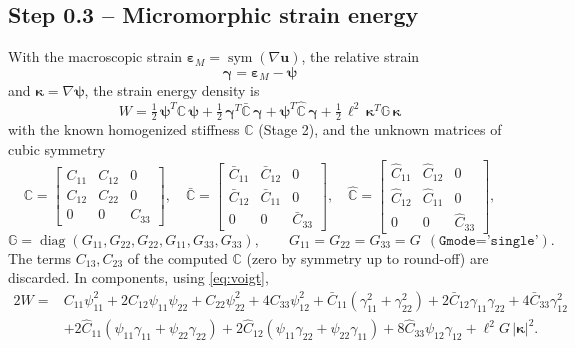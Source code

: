 \documentclass[11pt,a4paper]{article}
\newcommand{\C}{\mathbb{C}}                     %
\newcommand{\Cb}{\bar{\mathbb{C}}}              %
\newcommand{\Ch}{\hat{\mathbb{C}}}              %
\newcommand{\GG}{\mathbb{G}}                    %
\newcommand{\epsM}{\bm{\varepsilon}_{M}}
\newcommand{\bpsi}{\bm{\psi}}
\newcommand{\bgam}{\bm{\gamma}}
\newcommand{\bkap}{\bm{\kappa}}
\newcommand{\bu}{\bm{u}}
\newcommand{\sym}{\operatorname{sym}}
\newcommand{\code}[1]{\texttt{#1}}
\theoremstyle{plain}
\theoremstyle{remark}
\begin{document}
\subsection*{Step 0.3 -- Micromorphic strain energy}
With the macroscopic strain $\epsM=\sym(\nabla\bu)$, the relative strain
\begin{equation}
  \bgam=\epsM-\bpsi
  \label{eq:gammadef}
\end{equation}
and $\bkap=\nabla\bpsi$, the strain energy density is
\begin{equation}
  \boxed{\;W=\tfrac12\,\bpsi^T\C\,\bpsi+\tfrac12\,\bgam^T\Cb\,\bgam+\bpsi^T\Ch\,\bgam
  +\tfrac12\,\ell^2\,\bkap^T\GG\,\bkap\;}
  \label{eq:W}
\end{equation}
with the known homogenized stiffness $\C$ (Stage 2), and the unknown matrices of cubic symmetry
\begin{equation}
  \C=\begin{bmatrix}C_{11}&C_{12}&0\\C_{12}&C_{22}&0\\0&0&C_{33}\end{bmatrix},\quad
  \Cb=\begin{bmatrix}\bar C_{11}&\bar C_{12}&0\\\bar C_{12}&\bar C_{11}&0\\0&0&\bar C_{33}\end{bmatrix},\quad
  \Ch=\begin{bmatrix}\hat C_{11}&\hat C_{12}&0\\\hat C_{12}&\hat C_{11}&0\\0&0&\hat C_{33}\end{bmatrix},
  \label{eq:matrices}
\end{equation}
\begin{equation}
  \GG=\operatorname{diag}(G_{11},G_{22},G_{22},G_{11},G_{33},G_{33}),\qquad
  G_{11}=G_{22}=G_{33}=G\ \ (\code{Gmode='single'}).
  \label{eq:Gmat}
\end{equation}
The terms $C_{13},C_{23}$ of the computed $\C$ (zero by symmetry up to round-off) are discarded.
In components, using \eqref{eq:voigt},
\begin{align}
  2W={}&C_{11}\psi_{11}^2+2C_{12}\psi_{11}\psi_{22}+C_{22}\psi_{22}^2+4C_{33}\psi_{12}^2
  +\bar C_{11}(\gamma_{11}^2+\gamma_{22}^2)+2\bar C_{12}\gamma_{11}\gamma_{22}+4\bar C_{33}\gamma_{12}^2
  \nonumber\\
  &+2\hat C_{11}(\psi_{11}\gamma_{11}+\psi_{22}\gamma_{22})
  +2\hat C_{12}(\psi_{11}\gamma_{22}+\psi_{22}\gamma_{11})+8\hat C_{33}\psi_{12}\gamma_{12}
  +\ell^2G\,|\bkap|^2 .
  \label{eq:Wcomp}
\end{align}
\end{document}
